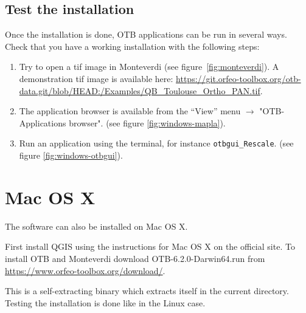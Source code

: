\documentclass[10pt,a4paper]{article}
\begin{document}
\subsection{Test the installation}
Once the installation is done, OTB applications can be run in several ways. Check that you have a working installation with the following steps:
\begin{enumerate}

\item Try to open a tif image in Monteverdi (see
figure~\ref{fig:monteverdi}). A demonstration tif image is available here: \url{https://git.orfeo-toolbox.org/otb-data.git/blob/HEAD:/Examples/QB\_Toulouse\_Ortho\_PAN.tif}.

\item The application browser is available from the ``View'' menu 
$\rightarrow$ "OTB-Applications browser".
(see figure \ref{fig:windows-mapla}).

\item Run an application using the terminal, for instance
\texttt{otbgui\_Rescale}. (see figure \ref{fig:windows-otbgui}).

\end{enumerate}

\clearpage
\section{Mac OS X}

The software can also be installed on Mac OS X.

First install QGIS using the instructions for Mac OS X on the official site. To install OTB and  Monteverdi download 
OTB-6.2.0-Darwin64.run from \url{https://www.orfeo-toolbox.org/download/}.

This is a self-extracting binary which extracts itself in the current directory. Testing the installation is done like in the Linux case.
\end{document}
